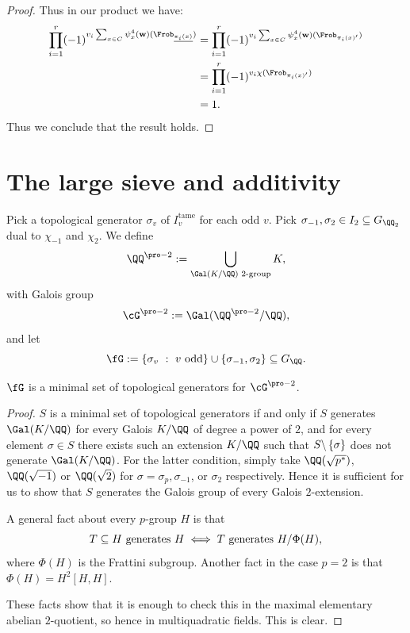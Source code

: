 \documentclass{lecturenotes}
\newcommand{\tame}{\operatorname{tame}}
\newcommand{\bw}{\mathbf{w}}
\numberwithin{equation}{section}
\begin{document}
\begin{proof}
    Thus in our product we have:
    \begin{align*}
        \prod_{i=1}^r(-1)^{v_i\sum_{x\in C}\psi_x^4(\bw)(\Frob_{\underline{\pi_i(x)}})}
        &=\prod_{i=1}^r(-1)^{v_i\sum_{x\in C}\psi_x^4(\bw)(\Frob_{\pi_i(x)'})}\\
        &=\prod_{i=1}^r(-1)^{v_i\chi(\Frob_{\pi_i(x)'})}\\
        &=1.
    \end{align*}
    Thus we conclude that the result holds.
\end{proof}

\lecture{}{}
\section{The large sieve and additivity}
Pick a topological generator $\sigma_v$ of $I_v^{\tame}$ for each odd $v$.  Pick $\sigma_{-1},\sigma_2\in I_2\subseteq G_{\QQ_2}$ dual to $\chi_{-1}$ and $\chi_{2}$.  We define
\[\QQ^{\pro-2}:=\bigcup_{\Gal(K/\QQ)\textnormal{ 2-group}}K,\]
with Galois group
\[\cG^{\pro-2}:=\gal(\QQ^{\pro-2}/\QQ),\]
and let 
\[\fG:=\set{\sigma_v~:~v\textnormal{ odd}}\cup\set{\sigma_{-1},\sigma_2}\subseteq G_\QQ.\]

\begin{theorem}
    $\fG$ is a minimal set of topological generators for $\cG^{\pro-2}$.
\end{theorem}
\begin{proof}
    $S$ is a minimal set of topological generators if and only if $S$ generates $\Gal(K/\QQ)$ for every Galois $K/\QQ$ of degree a power of $2$, and for every element $\sigma\in S$ there exists such an extension $K/\QQ$ such that $S\backslash\left\{{\sigma}\right\}$ does not generate $\gal(K/\QQ)$.  For the latter condition, simply take $\QQ(\sqrt{p^*})$, $\QQ(\sqrt{-1})$ or $\QQ(\sqrt{2})$ for $\sigma=\sigma_p,\sigma_{-1}$, or $\sigma_2$ respectively.  Hence it is sufficient for us to show that $S$ generates the Galois group of every Galois $2$-extension.

    A general fact about every $p$-group $H$ is that 
    \[T\subseteq H\textnormal{ generates }H\iff T\textnormal{ generates }H/\Phi(H),\]
    where $\Phi(H)$ is the Frattini subgroup.  Another fact in the case $p=2$ is that $\Phi(H)=H^2[H,H]$.

    These facts show that it is enough to check this in the maximal elementary abelian $2$-quotient, so hence in multiquadratic fields.  This is clear.
\end{proof}
\end{document}
